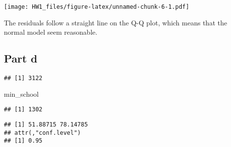\documentclass[
]{article}
\newenvironment{Shaded}{\begin{snugshade}}{\end{snugshade}}
\newcommand{\FunctionTok}[1]{\textcolor[rgb]{0.13,0.29,0.53}{\textbf{#1}}}
\newcommand{\NormalTok}[1]{#1}
\newcommand{\OtherTok}[1]{\textcolor[rgb]{0.56,0.35,0.01}{#1}}
\newcommand{\SpecialCharTok}[1]{\textcolor[rgb]{0.81,0.36,0.00}{\textbf{#1}}}
\newcommand{\StringTok}[1]{\textcolor[rgb]{0.31,0.60,0.02}{#1}}
\begin{document}
\texttt{[image: HW1\_files/figure-latex/unnamed-chunk-6-1.pdf]}

The residuals follow a straight line on the Q-Q plot, which means that
the normal model seem reasonable.

\hypertarget{part-d}{%
\subsection{Part d}\label{part-d}}

\begin{Shaded}
\end{Shaded}

\begin{verbatim}
## [1] 3122
\end{verbatim}

\begin{Shaded}
\begin{Highlighting}[]
\NormalTok{min\_school}
\end{Highlighting}
\end{Shaded}

\begin{verbatim}
## [1] 1302
\end{verbatim}

\begin{Shaded}
\end{Shaded}

\begin{verbatim}
## [1] 51.88715 78.14785
## attr(,"conf.level")
## [1] 0.95
\end{verbatim}
\end{document}
